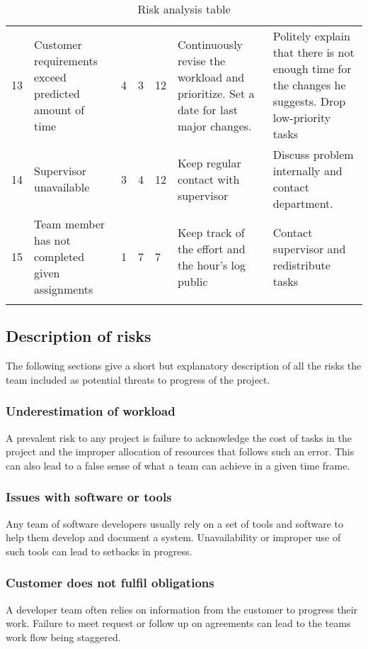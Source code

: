 \begin{longtable}{|p{0.5cm}!{\vrule width -1pt}p{3.6cm}!{\vrule width -1pt}l!{\vrule width -1pt}l!{\vrule width -1pt}l!{\vrule width -1pt}p{4.4cm}!{\vrule width -1pt}p{4.4cm}|}
13&Customer requirements exceed predicted amount of time& 4 & 3 & 12 & Continuously revise the workload and prioritize. Set a date for last major changes. & Politely explain that there is not enough time for the changes he suggests. Drop low-priority tasks\\
14&Supervisor unavailable & 3 & 4 & 12 & Keep regular contact with supervisor & Discuss problem internally and contact department.\\
15&Team member has not completed given assignments & 1 & 7 & 7 & Keep track of the effort and the hour's log public & Contact supervisor and redistribute tasks \\\hline
\caption{Risk analysis table}
\end{longtable}

\subsection{Description of risks}
The following sections give a short but explanatory description of all the risks the team included as potential threats to progress of the project.

\subsubsection{Underestimation of workload}
A prevalent risk to any project is failure to acknowledge the cost of tasks in the project and the improper allocation of resources that follows such an error. This can also lead to a false sense of what a team can achieve in a given time frame.

\subsubsection{Issues with software or tools}
Any team of software developers usually rely on a set of tools and software to help them develop and document a system. Unavailability or improper use of such tools can lead to setbacks in progress.

\subsubsection{Customer does not fulfil obligations}
A developer team often relies on information from the customer to progress their work. Failure to meet request or follow up on agreements can lead to the teams work flow being staggered.

